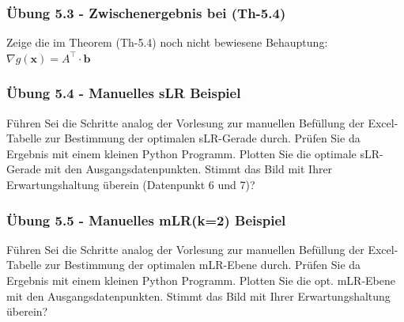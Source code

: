 \documentclass[12pt]{article}
\begin{document}
\subsubsection{Übung 5.3 - Zwischenergebnis bei (Th-5.4)}
Zeige die im Theorem (Th-5.4) noch nicht bewiesene Behauptung:\\ 
\hspace*{4.5cm} $ \nabla g(\mathbf{x}) = A^\top \cdot \mathbf{b}$

\subsubsection{Übung 5.4 - Manuelles sLR Beispiel}
Führen Sei die Schritte analog der Vorlesung zur manuellen Befüllung der Excel-Tabelle zur Bestimmung der optimalen sLR-Gerade durch. Prüfen Sie da Ergebnis mit einem kleinen Python Programm. Plotten Sie die optimale sLR-Gerade mit den Ausgangsdatenpunkten. Stimmt das Bild mit Ihrer Erwartungshaltung überein (Datenpunkt 6 und 7)?

\subsubsection{Übung 5.5 - Manuelles mLR(k=2) Beispiel}
Führen Sei die Schritte analog der Vorlesung zur manuellen Befüllung der Excel-Tabelle zur Bestimmung der optimalen mLR-Ebene durch. Prüfen Sie da Ergebnis mit einem kleinen Python Programm. Plotten Sie die opt. mLR-Ebene mit den Ausgangsdatenpunkten. Stimmt das Bild mit Ihrer Erwartungshaltung überein?
\end{document}
